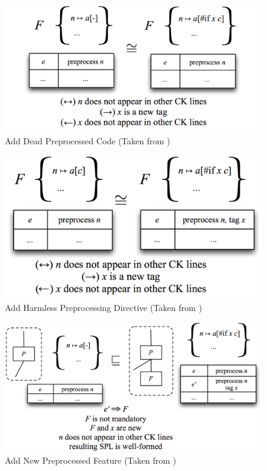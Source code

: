 \documentclass[12pt]{article}
\begin{document}
\begin{figure}[H]
\centering
\includegraphics[width=1\textwidth, frame]{images/Template2T}
\caption{Add Dead Preprocessed Code (Taken from \cite{twiki})}
\end{figure}

\begin{figure}[H]
\centering
\includegraphics[width=1\textwidth, frame]{images/Template3T}
\caption{Add Harmless Preprocessing Directive (Taken from \cite{twiki})}
\end{figure}

\begin{figure}[H]
\centering
\includegraphics[width=1\textwidth, frame]{images/Template4T}
\caption{Add New Preprocessed Feature (Taken from \cite{twiki})}
\end{figure}
\end{document}
